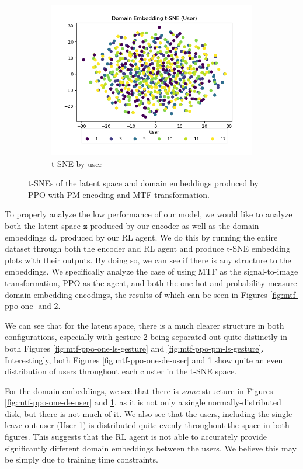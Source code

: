 \begin{figure}
\begin{subfigure}{0.3\textwidth}
		\includegraphics[width=\textwidth]{figures/mtf-ppo-pm/de-user}
		\caption{t-SNE by user}
		\label{fig:mtf-ppo-pm-de-user}
	\end{subfigure}
	\caption{t-SNEs of the latent space and domain embeddings produced by PPO with PM encoding and MTF transformation.}
	\label{fig:mtf-ppo-pm}
\end{figure}

To properly analyze the low performance of our model, we would like to analyze both the latent space $\boldsymbol{z}$ produced by our encoder as well as the domain embeddings $\boldsymbol{d}_{r}$ produced by our RL agent.
We do this by running the entire dataset through both the encoder and RL agent and produce t-SNE embedding plots with their outputs.
By doing so, we can see if there is any structure to the embeddings.
We specifically analyze the case of using MTF as the signal-to-image transformation, PPO as the agent, and both the one-hot and probability measure domain embedding encodings, the results of which can be seen in Figures \ref{fig:mtf-ppo-one} and \ref{fig:mtf-ppo-pm}.

We can see that for the latent space, there is a much clearer structure in both configurations, especially with gesture 2 being separated out quite distinctly in both Figures \ref{fig:mtf-ppo-one-ls-gesture} and \ref{fig:mtf-ppo-pm-ls-gesture}. 
Interestingly, both Figures \ref{fig:mtf-ppo-one-de-user} and \ref{fig:mtf-ppo-pm-de-user} show quite an even distribution of users throughout each cluster in the t-SNE space.

For the domain embeddings, we see that there is \textit{some} structure in Figures \ref{fig:mtf-ppo-one-de-user} and \ref{fig:mtf-ppo-pm-de-user}, as it is not only a single normally-distributed disk, but there is not much of it.
We also see that the users, including the single-leave out user (User 1) is distributed quite evenly throughout the space in both figures.
This suggests that the RL agent is not able to accurately provide significantly different domain embeddings between the users.
We believe this may be simply due to training time constraints.

